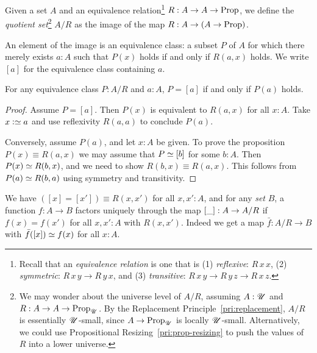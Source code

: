 \begin{definition}\label{def:quotient-set}
Given a set $A$ and an equivalence relation\footnote{%
  Recall that an \emph{equivalence relation} is one that is
  (1) \emph{reflexive}: $R\,x\,x$,
  (2) \emph{symmetric}: $R\,x\,y \to R\,y\,x$, and
  (3) \emph{transitive}: $R\,x\,y \to R\,y\,z \to R\,x\,z$.}
$R : A \to A \to \mathrm{Prop}$,
we define the \emph{quotient set}\footnote{%
  We may wonder about the universe level of $A/R$,
  assuming $A : {\mathscr{U}}$ and $R : A \to A \to \mathrm{Prop}_{\mathscr{U}}$.
  By the Replacement Principle~\cref{pri:replacement},
  $A/R$ is essentially ${\mathscr{U}}$-small, since $A\to\mathrm{Prop}_{\mathscr{U}}$
  is locally ${\mathscr{U}}$-small. Alternatively, we could use
  Propositional Resizing~\cref{pri:prop-resizing} to push
  the values of $R$ into a lower universe.}
$A/R$ as the image of the map $R : A \to (A \to \mathrm{Prop})$.
\end{definition}
An element of the image is an equivalence class:
a subset $P$ of $A$ for which there merely exists $a:A$
such that $P(x)$ holds if and only if $R(a,x)$ holds.
We write $[a]$ for the equivalence class containing $a$.
\begin{lemma}\label{lem:equiv-class-prop}
  For any equivalence class $P : A/R$ and $a:A$,
  $P = [a]$ if and only if $P(a)$ holds.
\end{lemma}
\begin{proof}
  Assume $P = [a]$. Then $P(x)$ is equivalent to $R(a,x)$ for all $x:A$.
  Take $x\defeq a$ and use reflexivity $R(a,a)$ to conclude $P(a)$.

  Conversely, assume $P(a)$, and let $x:A$ be given.
  To prove the proposition $P(x) \equiv R(a,x)$ we may assume that
  $P \jdeq [b]$ for some $b:A$.
  Then $P(x) \jdeq R(b,x)$, and we need to show $R(b,x) \equiv R(a,x)$.
  This follows from $P(a) \jdeq R(b,a)$ using symmetry and transitivity.
\end{proof}
\begin{theorem}\label{thm:quotient-property}
  We have $([x] = [x']) \equiv R(x,x')$ for all $x,x':A$,
  and for any \emph{set} $B$, a
  function $f : A \to B$ factors uniquely through the map $[\_] : A \to A/R$ if
  $f(x)=f(x')$ for all $x,x':A$ with $R(x,x')$.
  Indeed we get a map $\bar f : A/R \to B$ with
  $\bar f([x]) \jdeq f(x)$ for all $x:A$.
\end{theorem}
